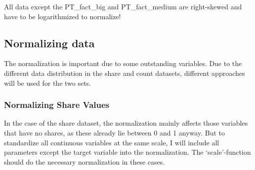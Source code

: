\documentclass[
]{article}
\begin{document}
All data except the PT\_fact\_big and PT\_fact\_medium are right-skewed
and have to be logarithmized to normalize!

\hypertarget{normalizing-data}{%
\subsection{Normalizing data}\label{normalizing-data}}

The normalization is important due to some outstanding variables. Due to
the different data distribution in the share and count datasets,
different approaches will be used for the two sets.

\hypertarget{normalizing-share-values}{%
\subsubsection{Normalizing Share
Values}\label{normalizing-share-values}}

In the case of the share dataset, the normalization mainly affects those
variables that have no shares, as these already lie between 0 and 1
anyway. But to standardize all continuous variables at the same scale, I
will include all parameters except the target variable into the
normalization. The `scale'-function should do the necessary
normalization in these cases.
\end{document}
